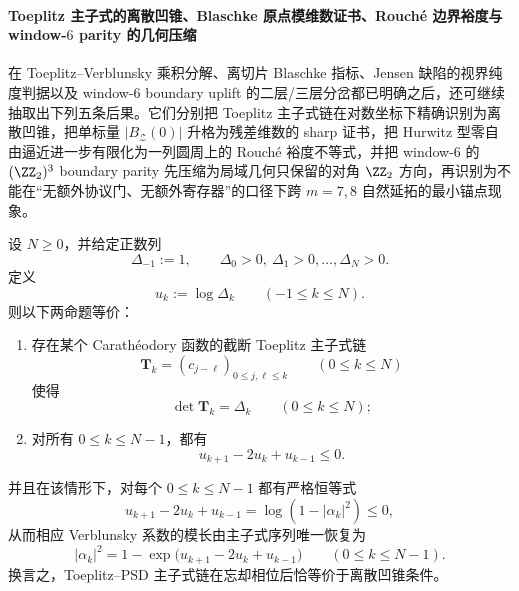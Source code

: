 \paragraph{Toeplitz 主子式的离散凹锥、Blaschke 原点模维数证书、Rouch\'e 边界裕度与 window-\(6\) parity 的几何压缩}
在 Toeplitz--Verblunsky 乘积分解、离切片 Blaschke 指标、Jensen 缺陷的视界纯度判据以及 window-\(6\) boundary uplift 的二层/三层分岔都已明确之后，还可继续抽取出下列五条后果。它们分别把 Toeplitz 主子式链在对数坐标下精确识别为离散凹锥，把单标量 \(|B_{\mathcal Z}(0)|\) 升格为残差维数的 sharp 证书，把 Hurwitz 型零自由逼近进一步有限化为一列圆周上的 Rouch\'e 裕度不等式，并把 window-\(6\) 的 \((\ZZ_2)^3\) boundary parity 先压缩为局域几何只保留的对角 \(\ZZ_2\) 方向，再识别为不能在“无额外协议门、无额外寄存器”的口径下跨 \(m=7,8\) 自然延拓的最小锚点现象。

\begin{theorem}\label{thm:xi-time-part65e-toeplitz-local-logconcavity-realizability}
设 \(N\ge 0\)，并给定正数列
\[
\Delta_{-1}:=1,
\qquad
\Delta_0>0,\ \Delta_1>0,\dots,\Delta_N>0.
\]
定义
\[
u_k:=\log \Delta_k
\qquad(-1\le k\le N).
\]
则以下两命题等价：
\begin{enumerate}
  \item 存在某个 Carath\'eodory 函数的截断 Toeplitz 主子式链
  \[
  \mathbf T_k=(c_{j-\ell})_{0\le j,\ell\le k}
  \qquad(0\le k\le N)
  \]
  使得
  \[
  \det \mathbf T_k=\Delta_k
  \qquad(0\le k\le N);
  \]
  \item 对所有 \(0\le k\le N-1\)，都有
  \[
  u_{k+1}-2u_k+u_{k-1}\le 0.
  \]
\end{enumerate}
并且在该情形下，对每个 \(0\le k\le N-1\) 都有严格恒等式
\[
\boxed{\;
u_{k+1}-2u_k+u_{k-1}
=
\log(1-|\alpha_k|^2)\le 0,
\;}
\]
从而相应 Verblunsky 系数的模长由主子式序列唯一恢复为
\[
|\alpha_k|^2
=
1-\exp\!\bigl(u_{k+1}-2u_k+u_{k-1}\bigr)
\qquad(0\le k\le N-1).
\]
换言之，Toeplitz--PSD 主子式链在忘却相位后恰等价于离散凹锥条件。
\end{theorem}
